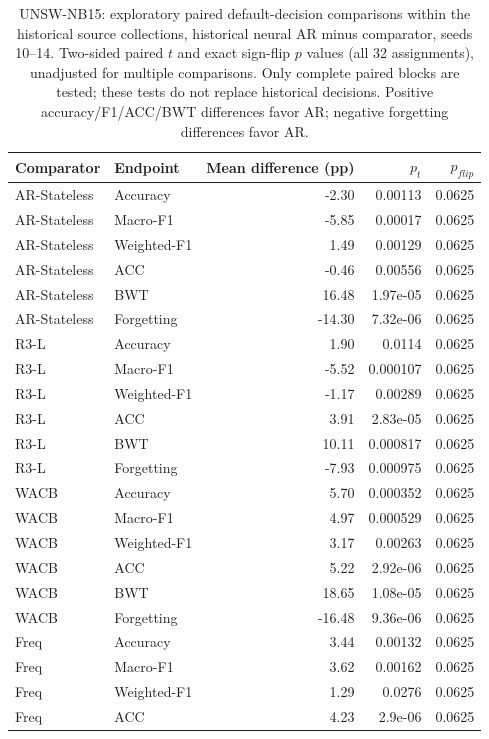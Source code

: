 \begin{table}[t]\centering\scriptsize
\caption{UNSW-NB15: exploratory paired default-decision comparisons within the historical source collections, historical neural AR minus comparator, seeds 10--14. Two-sided paired $t$ and exact sign-flip $p$ values (all 32 assignments), unadjusted for multiple comparisons. Only complete paired blocks are tested; these tests do not replace historical decisions. Positive accuracy/F1/ACC/BWT differences favor AR; negative forgetting differences favor AR.}
\begin{tabular}{llrrr}\toprule Comparator & Endpoint & Mean difference (pp) & $p_t$ & $p_{flip}$ \\\midrule
AR-Stateless & Accuracy & -2.30 & 0.00113 & 0.0625 \\
AR-Stateless & Macro-F1 & -5.85 & 0.00017 & 0.0625 \\
AR-Stateless & Weighted-F1 & 1.49 & 0.00129 & 0.0625 \\
AR-Stateless & ACC & -0.46 & 0.00556 & 0.0625 \\
AR-Stateless & BWT & 16.48 & 1.97e-05 & 0.0625 \\
AR-Stateless & Forgetting & -14.30 & 7.32e-06 & 0.0625 \\
R3-L & Accuracy & 1.90 & 0.0114 & 0.0625 \\
R3-L & Macro-F1 & -5.52 & 0.000107 & 0.0625 \\
R3-L & Weighted-F1 & -1.17 & 0.00289 & 0.0625 \\
R3-L & ACC & 3.91 & 2.83e-05 & 0.0625 \\
R3-L & BWT & 10.11 & 0.000817 & 0.0625 \\
R3-L & Forgetting & -7.93 & 0.000975 & 0.0625 \\
WACB & Accuracy & 5.70 & 0.000352 & 0.0625 \\
WACB & Macro-F1 & 4.97 & 0.000529 & 0.0625 \\
WACB & Weighted-F1 & 3.17 & 0.00263 & 0.0625 \\
WACB & ACC & 5.22 & 2.92e-06 & 0.0625 \\
WACB & BWT & 18.65 & 1.08e-05 & 0.0625 \\
WACB & Forgetting & -16.48 & 9.36e-06 & 0.0625 \\
Freq & Accuracy & 3.44 & 0.00132 & 0.0625 \\
Freq & Macro-F1 & 3.62 & 0.00162 & 0.0625 \\
Freq & Weighted-F1 & 1.29 & 0.0276 & 0.0625 \\
Freq & ACC & 4.23 & 2.9e-06 & 0.0625 \\

\end{tabular}
\end{table}
